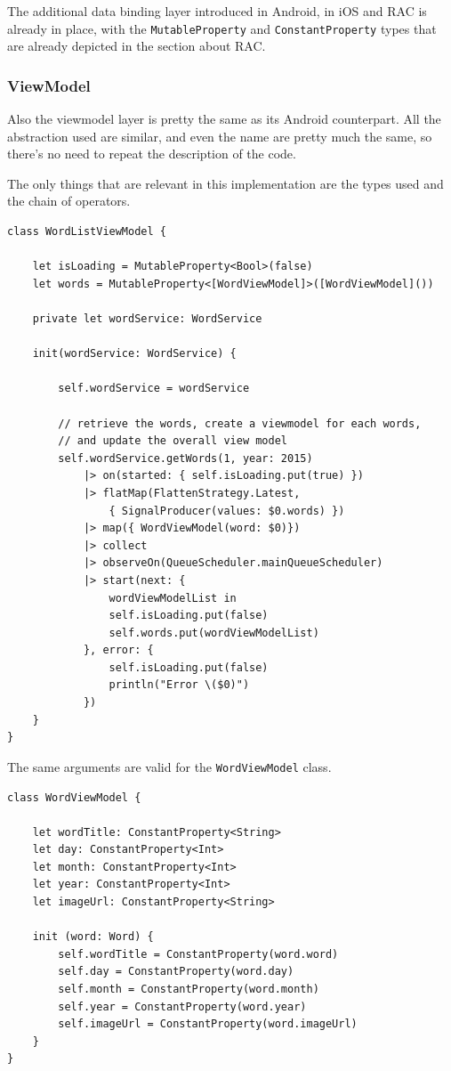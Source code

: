 The additional data binding layer introduced in Android, in iOS and RAC
is already in place, with the \texttt{MutableProperty} and
\texttt{ConstantProperty} types that are already depicted in the section
about RAC.

\subsubsection{ViewModel}\label{viewmodel}

Also the viewmodel layer is pretty the same as its Android counterpart.
All the abstraction used are similar, and even the name are pretty much
the same, so there's no need to repeat the description of the code.

The only things that are relevant in this implementation are the types
used and the chain of operators.

\begin{verbatim}
class WordListViewModel {

    let isLoading = MutableProperty<Bool>(false)
    let words = MutableProperty<[WordViewModel]>([WordViewModel]())

    private let wordService: WordService

    init(wordService: WordService) {

        self.wordService = wordService

        // retrieve the words, create a viewmodel for each words,
        // and update the overall view model
        self.wordService.getWords(1, year: 2015)
            |> on(started: { self.isLoading.put(true) })
            |> flatMap(FlattenStrategy.Latest,
                { SignalProducer(values: $0.words) })
            |> map({ WordViewModel(word: $0)})
            |> collect
            |> observeOn(QueueScheduler.mainQueueScheduler)
            |> start(next: {
                wordViewModelList in
                self.isLoading.put(false)
                self.words.put(wordViewModelList)
            }, error: {
                self.isLoading.put(false)
                println("Error \($0)")
            })
    }
}
\end{verbatim}

The same arguments are valid for the \texttt{WordViewModel} class.

\begin{verbatim}
class WordViewModel {

    let wordTitle: ConstantProperty<String>
    let day: ConstantProperty<Int>
    let month: ConstantProperty<Int>
    let year: ConstantProperty<Int>
    let imageUrl: ConstantProperty<String>

    init (word: Word) {
        self.wordTitle = ConstantProperty(word.word)
        self.day = ConstantProperty(word.day)
        self.month = ConstantProperty(word.month)
        self.year = ConstantProperty(word.year)
        self.imageUrl = ConstantProperty(word.imageUrl)
    }
}
\end{verbatim}

